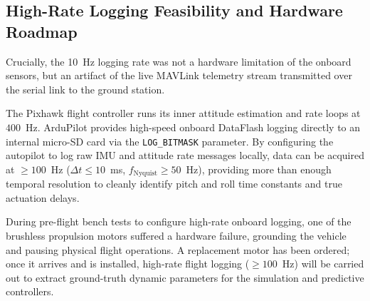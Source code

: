 \documentclass[11pt,a4paper]{article}
\begin{document}
\subsection{High-Rate Logging Feasibility and Hardware Roadmap}
Crucially, the 10~Hz logging rate was not a hardware limitation of the onboard sensors, but an artifact of the live MAVLink telemetry stream transmitted over the serial link to the ground station.

The Pixhawk flight controller runs its inner attitude estimation and rate loops at $400$~Hz. ArduPilot provides high-speed onboard DataFlash logging directly to an internal micro-SD card via the \texttt{LOG\_BITMASK} parameter. By configuring the autopilot to log raw IMU and attitude rate messages locally, data can be acquired at $\ge 100$~Hz ($\Delta t \le 10$~ms, $f_{\text{Nyquist}} \ge 50$~Hz), providing more than enough temporal resolution to cleanly identify pitch and roll time constants and true actuation delays.

During pre-flight bench tests to configure high-rate onboard logging, one of the brushless propulsion motors suffered a hardware failure, grounding the vehicle and pausing physical flight operations. A replacement motor has been ordered; once it arrives and is installed, high-rate flight logging ($\ge 100$~Hz) will be carried out to extract ground-truth dynamic parameters for the simulation and predictive controllers.
\end{document}
